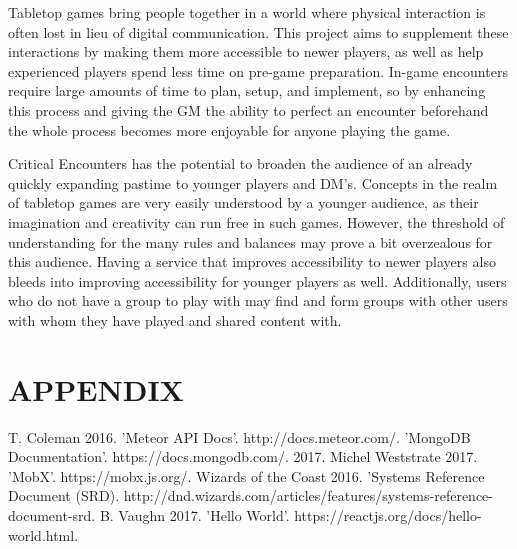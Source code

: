 \documentclass[letterpaper, 10 pt, conference]{ieeeconf}
\begin{document}
Tabletop games bring people together in a world where physical interaction is
often lost in lieu of digital communication. This project aims to supplement these
interactions by making them more accessible to newer players, as well as help
experienced players spend less time on pre-game preparation. In-game encounters
require large amounts of time to plan, setup, and implement, so by enhancing
this process and giving the GM the ability to perfect an encounter beforehand the
whole process becomes more enjoyable for anyone playing the game.
\par Critical Encounters has the potential to broaden the audience of an already quickly
expanding pastime to younger players and DM’s. Concepts in the realm of tabletop
games are very easily understood by a younger audience, as their imagination and
creativity can run free in such games. However, the threshold of understanding
for the many rules and balances may prove a bit overzealous for this audience.
Having a service that improves accessibility to newer players  also bleeds
into improving accessibility for younger players as well. Additionally, users who
do not have a group to play with may find and form groups with other users with
whom they have played and shared content with.

\section*{APPENDIX}

\listoffigures

\begin{thebibliography}{99}

 T. Coleman 2016. 'Meteor API Docs'. http://docs.meteor.com/.
 'MongoDB Documentation'. https://docs.mongodb.com/. 2017.
 Michel Weststrate 2017. 'MobX'. https://mobx.js.org/.
 Wizards of the Coast 2016. 'Systems Reference Document (SRD). http://dnd.wizards.com/articles/features/systems-reference-document-srd.
 B. Vaughn 2017. 'Hello World'. https://reactjs.org/docs/hello-world.html.

\end{thebibliography}
\end{document}
